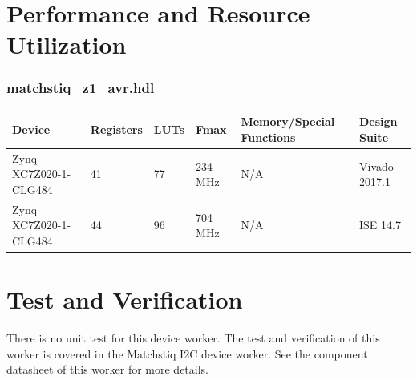\documentclass{article}
\def\comp{matchstiq\_z1\_avr}
\begin{document}
\section*{Performance and Resource Utilization}
\subsubsection*{\comp.hdl}
\begin{scriptsize}
	\begin{tabular}{|M{4.5cm}|M{1cm}|M{1cm}|M{1.5cm}|M{2cm}|M{2cm}|}
		\hline
		Device                      & Registers & LUTs & Fmax    & Memory/Special Functions & Design Suite    \\
		\hline
		Zynq XC7Z020-1-CLG484       & 41        & 77   & 234 MHz & N/A                      & Vivado 2017.1        \\
		\hline
		Zynq XC7Z020-1-CLG484       & 44        & 96   & 704 MHz & N/A                      & ISE 14.7        \\
		\hline
	\end{tabular}
\end{scriptsize}

\section*{Test and Verification}
There is no unit test for this device worker. The test and verification of this worker is covered in the Matchstiq I2C device worker. See the component datasheet of this worker for more details.
\end{document}
